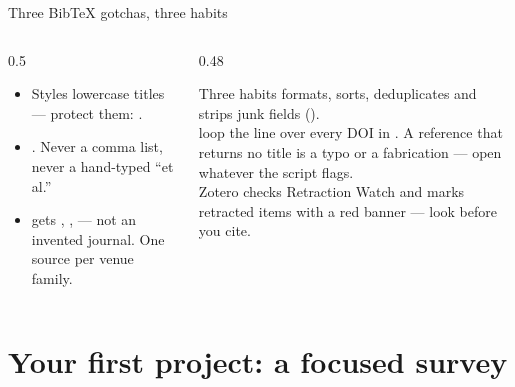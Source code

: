 \documentclass[aspectratio=169,11pt]{beamer}
\begin{document}
\begin{frame}{Three BibTeX gotchas, three habits}
\begin{columns}[T]
\begin{column}{0.5\textwidth}
\footnotesize
\begin{itemize}
  \item {} Styles lowercase titles --- protect them:
        .
  \item {} . Never a comma
        list, never a hand-typed ``et al.''
  \item {} gets , ,
         --- not an invented journal. One source per venue
        family.
\end{itemize}
\end{column}
\begin{column}{0.48\textwidth}
\begin{block}{Three habits}
\footnotesize
{} formats, sorts, deduplicates and strips junk fields
().\\[3pt]
 loop the  line over every DOI in . A
reference that returns no title is a typo or a fabrication --- open whatever
the script flags.\\[3pt]
 Zotero checks Retraction Watch and marks retracted items
with a red banner --- look before you cite.
\end{block}
\end{column}
\end{columns}
\end{frame}

\section{Your first project: a focused survey}
\end{document}
